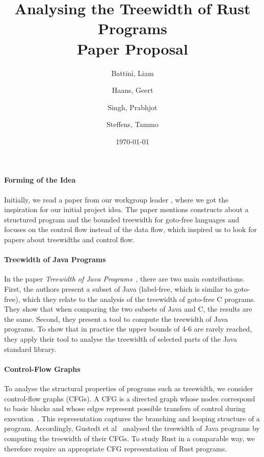 \documentclass{article}
\title{%
  Analysing the Treewidth of Rust Programs \\
  \large Paper Proposal}
\author{
    Battini, Liam
    \and
    Haans, Geert
    \and
    Singh, Prabhjot
    \and
    Steffens, Tammo
}
\date{\today}
\begin{document}
\maketitle

\paragraph{Forming of the Idea}

Initially, we read a paper from our workgroup leader \cite{70be595fc13c49b985f1c3fe0868255b}, where we got the inspiration for our initial project idea.
The paper mentions constructs about a structured program and the bounded treewidth for goto-free languages and focuses on the control flow instead of the data flow, which inspired us to look for papers about treewidths and control flow.

\paragraph{Treewidth of Java Programs}

In the paper \textit{Treewidth of Java Programs}~\cite{gustedt_treewidth_2002}, there are two main contributions.
First, the authors present a subset of Java (label-free, which is similar to goto-free), which they relate to the analysis of the treewidth of goto-free C programs.
They show that when comparing the two subsets of Java and C, the results are the same.
Second, they present a tool to compute the treewidth of Java programs.
To show that in practice the upper bounds of 4-6 are rarely reached, they apply their tool to analyse the treewidth of selected parts of the Java standard library.

\paragraph{Control-Flow Graphs}
To analyse the structural properties of programs such as treewidth, we consider control-flow graphs (CFGs).
A CFG is a directed graph whose nodes correspond to basic blocks and whose edges represent possible transfers of control during execution~\cite{aho2006compilers}.
This representation captures the branching and looping structure of a program.
Accordingly, Gustedt et al~\cite{gustedt_treewidth_2002} analysed the treewidth of Java programs by computing the treewidth of their CFGs.
To study Rust in a comparable way, we therefore require an appropriate CFG representation of Rust programs.
\end{document}
